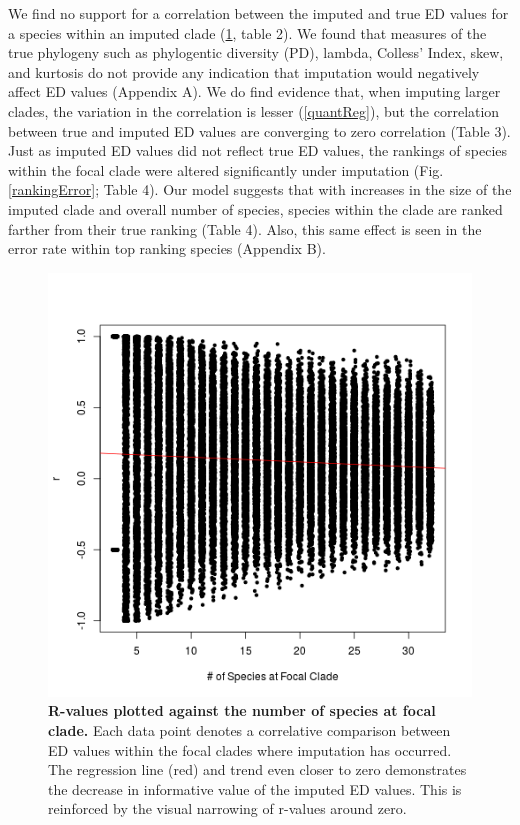 \documentclass[12pt,english]{article}
\begin{document}
We find no support for a correlation between the imputed and true ED values for
a species within an imputed clade (\ref{imputationTrend}, table 2). We found
that measures of the true phylogeny such as phylogentic diversity (PD), lambda,
Colless' Index, skew, and kurtosis do not provide any indication that imputation
would negatively affect ED values (Appendix A). We do find evidence that, when
imputing larger clades, the variation in the correlation is lesser
(\ref{quantReg}), but the correlation between true and imputed ED values are
converging to zero correlation (Table 3). Just as imputed ED values did not reflect true ED
values, the rankings of species within the focal clade were altered
significantly under imputation (Fig. \ref{rankingError}; Table 4). Our model
suggests that with increases in the size of the imputed clade and overall number
of species, species within the clade are ranked farther from their true ranking
(Table 4). Also, this same effect is seen in the error rate within top ranking
species (Appendix B).

\begin{figure}[!ht]
  \center
  \includegraphics[width=.5\textwidth]{edModel.png}
  \caption{\textbf{R-values plotted against the number of species at focal
  clade.} Each data point denotes a correlative comparison between ED values
  within the focal clades where imputation has occurred. The regression line
  (red) and trend even closer to zero demonstrates the decrease in informative
  value of the imputed ED values. This is reinforced by the visual narrowing of
  r-values around zero.}
  \label{imputationTrend}
\end{figure}
\end{document}
